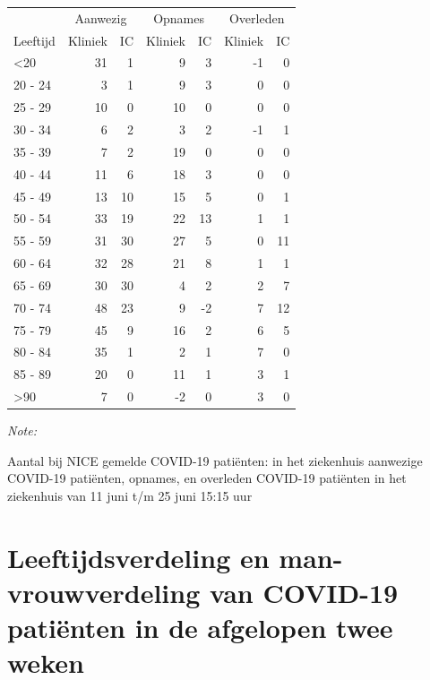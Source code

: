 \documentclass[
  english,
  man,floatsintext]{apa6}
\begin{document}
\begin{table}
\centering\begingroup\fontsize{10}{12}\selectfont

\begin{threeparttable}
\begin{tabular}{lrrrrrr}
\toprule
\multicolumn{1}{c}{ } & \multicolumn{2}{c}{Aanwezig} & \multicolumn{2}{c}{Opnames} & \multicolumn{2}{c}{Overleden} \\
\cmidrule(l{3pt}r{3pt}){2-3} \cmidrule(l{3pt}r{3pt}){4-5} \cmidrule(l{3pt}r{3pt}){6-7}
Leeftijd & Kliniek & IC & Kliniek & IC & Kliniek & IC\\
\midrule
<20 & 31 & 1 & 9 & 3 & -1 & 0\\
20 - 24 & 3 & 1 & 9 & 3 & 0 & 0\\
25 - 29 & 10 & 0 & 10 & 0 & 0 & 0\\
30 - 34 & 6 & 2 & 3 & 2 & -1 & 1\\
35 - 39 & 7 & 2 & 19 & 0 & 0 & 0\\
40 - 44 & 11 & 6 & 18 & 3 & 0 & 0\\
45 - 49 & 13 & 10 & 15 & 5 & 0 & 1\\
50 - 54 & 33 & 19 & 22 & 13 & 1 & 1\\
55 - 59 & 31 & 30 & 27 & 5 & 0 & 11\\
60 - 64 & 32 & 28 & 21 & 8 & 1 & 1\\
65 - 69 & 30 & 30 & 4 & 2 & 2 & 7\\
70 - 74 & 48 & 23 & 9 & -2 & 7 & 12\\
75 - 79 & 45 & 9 & 16 & 2 & 6 & 5\\
80 - 84 & 35 & 1 & 2 & 1 & 7 & 0\\
85 - 89 & 20 & 0 & 11 & 1 & 3 & 1\\
>90 & 7 & 0 & -2 & 0 & 3 & 0\\
\bottomrule
\end{tabular}
\begin{tablenotes}
\item \textit{Note: } 
\item Aantal bij NICE gemelde COVID-19 patiënten: in het ziekenhuis aanwezige COVID-19 patiënten, opnames, en overleden COVID-19 patiënten in het ziekenhuis van 11 juni t/m 25 juni 15:15 uur
\end{tablenotes}
\end{threeparttable}
\endgroup{}
\end{table}

\newpage

\hypertarget{leeftijdsverdeling-en-man-vrouwverdeling-van-covid-19-patiuxebnten-in-de-afgelopen-twee-weken}{%
\section{Leeftijdsverdeling en man-vrouwverdeling van COVID-19 patiënten in de afgelopen twee weken}\label{leeftijdsverdeling-en-man-vrouwverdeling-van-covid-19-patiuxebnten-in-de-afgelopen-twee-weken}}
\end{document}
